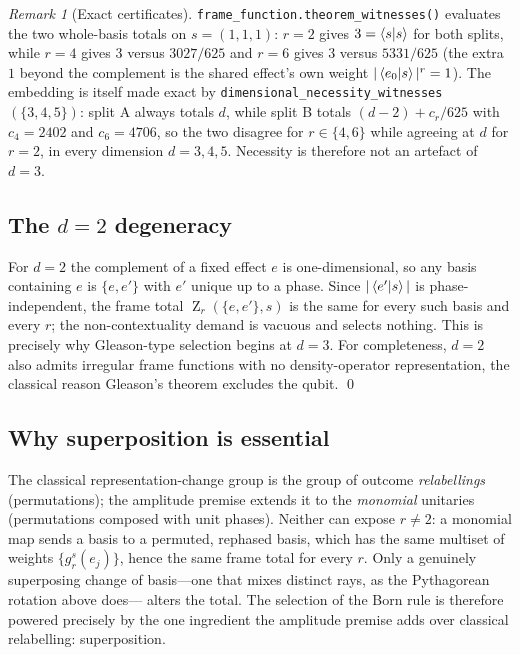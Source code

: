 \documentclass[11pt,a4paper]{article}
\theoremstyle{definition}
\theoremstyle{remark}
\newtheorem{remark}{Remark}
\DeclareMathOperator{\Zframe}{Z}
\begin{document}
\begin{remark}[Exact certificates]
\texttt{frame\_function.theorem\_witnesses()} evaluates the two whole-basis totals on
$s=(1,1,1)$: $r=2$ gives $3=\braket{s|s}$ for both splits, while $r=4$ gives $3$ versus
$3027/625$ and $r=6$ gives $3$ versus $5331/625$ (the extra $1$ beyond the complement is the
shared effect's own weight $|\braket{e_0|s}|^{r}=1$). The embedding is itself made exact by
\texttt{dimensional\_necessity\_witnesses}$(\{3,4,5\})$: split A always totals $d$, while
split B totals $(d-2)+c_r/625$ with $c_4=2402$ and $c_6=4706$, so the two disagree for
$r\in\{4,6\}$ while agreeing at $d$ for $r=2$, in every dimension $d=3,4,5$. Necessity is
therefore not an artefact of $d=3$.
\end{remark}

\subsection{The \texorpdfstring{$d=2$}{d=2} degeneracy}

For $d=2$ the complement of a fixed effect $e$ is one-dimensional, so any basis containing
$e$ is $\{e,e'\}$ with $e'$ unique up to a phase. Since $|\braket{e'|s}|$ is
phase-independent, the frame total $\Zframe_r(\{e,e'\},s)$ is the same for every such basis
and every $r$; the non-contextuality demand is vacuous and selects nothing. This is precisely
why Gleason-type selection begins at $d=3$. For completeness, $d=2$ also admits irregular
frame functions with no density-operator representation, the classical reason Gleason's
theorem excludes the qubit. \qed

\subsection{Why superposition is essential}

The classical representation-change group is the group of outcome \emph{relabellings}
(permutations); the amplitude premise extends it to the \emph{monomial} unitaries
(permutations composed with unit phases). Neither can expose $r\neq 2$: a monomial map sends
a basis to a permuted, rephased basis, which has the same multiset of weights
$\{g_r^{s}(e_j)\}$, hence the same frame total for every $r$. Only a genuinely superposing
change of basis---one that mixes distinct rays, as the Pythagorean rotation above does---
alters the total. The selection of the Born rule is therefore powered precisely by the one
ingredient the amplitude premise adds over classical relabelling: superposition.
\end{document}
